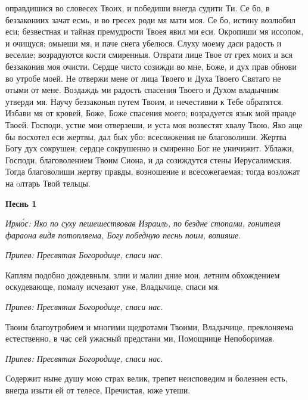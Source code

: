 оправдишися во словесех Твоих, и победиши внегда судити Ти. Се бо, в
беззакониих зачат есмь, и во гресех роди мя мати моя. Се бо, истину
возлюбил еси; безвестная и тайная премудрости Твоея явил ми еси.
Окропиши мя иссопом, и очищуся; омыеши мя, и паче снега убелюся. Слуху
моему даси радость и веселие; возрадуются кости смиренныя. Отврати лице
Твое от грех моих и вся беззакония моя очисти. Сердце чисто созижди во
мне, Боже, и дух прав обнови во утробе моей. Не отвержи мене от
лица Твоего и Духа Твоего Святаго не отыми от мене. Воздаждь ми
радость спасения Твоего и Духом владычним утверди мя. Научу
беззаконыя путем Твоим, и нечестивии к Тебе обратятся. Избави мя от
кровей, Боже, Боже спасения моего; возрадуется язык мой правде
Твоей. Господи, устне мои отверзеши, и уста моя возвестят хвалу
Твою. Яко аще бы восхотел еси жертвы, дал бых убо: всесожжения не
благоволиши. Жертва Богу дух сокрушен; сердце сокрушенно и смиренно
Бог не уничижит. Ублажи, Господи, благоволением Твоим Сиона, и
да созиждутся стены Иерусалимския. Тогда благоволиши жертву
правды, возношение и всесожегаемая; тогда возложат на oлтарь Твой
тельцы.



 

\bfseries Песнь 1\normalfont{}


 \itshape Ирмо́с:\normalfont{} Яко по суху пешешествовав Израиль, по бездне стопами, гонителя
фараона видя потопляема, Богу победную песнь поим, вопияше.



 \itshape Припев:\normalfont{} Пресвятая Богородице, спаси нас.



   Каплям подобно дождевным, злии и малии дние мои, летним
обхождением оскудевающе, помалу исчезают уже, Владычице, спаси
мя.



 \itshape Припев:\normalfont{} Пресвятая Богородице, спаси нас.



   Твоим благоутробием и многими щедротами Твоими, Владычице,
преклоняема естественно, в час сей ужасный предстани ми, Помощнице
Непоборимая.



 \itshape Припев:\normalfont{} Пресвятая Богородице, спаси нас.



   Содержит ныне душу мою страх велик, трепет неисповедим и болезнен
есть, внегда изыти ей от телесе, Пречистая, юже утеши.




